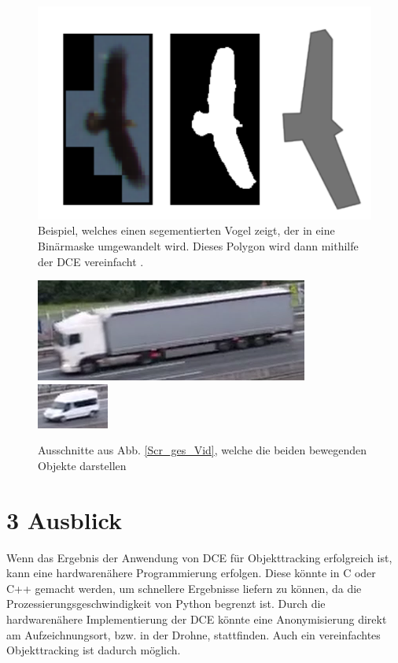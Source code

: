 \documentclass[a4paper,11pt,pdftex, parskip]{scrreprt}
\begin{document}
\begin{figure}[ht]
    \centering
    \includegraphics*[scale = 0.5, keepaspectratio]{images/Example_bird.png}
    \caption[Beispielablauf der Segmentierung und DCE aus \citet{Dorr2017}]{Beispiel, welches einen segementierten Vogel zeigt, der in eine Binärmaske umgewandelt wird. Dieses Polygon wird dann mithilfe der DCE vereinfacht \citep{Dorr2017}.}
    \label{Bsp_Dorr}
\end{figure}
\begin{figure}[ht]
    \centering
    \includegraphics[scale = 1, keepaspectratio] {images/detail_screenshot_lkw_yt.png}
    \includegraphics[scale = 2.25, keepaspectratio] {images/detail_screenshot_car_yt.png}
    \caption[Ausschnitte aus Abb. \ref{Scr_ges_Vid}, welche bewegenden Objekte darstellen ]{Ausschnitte aus Abb. \ref{Scr_ges_Vid}, welche die beiden bewegenden Objekte darstellen \citep{Metz2022}}
    \label{Scr_detail_Obj}
\end{figure}




\section*{3 Ausblick}
Wenn das Ergebnis der Anwendung von DCE für Objekttracking erfolgreich ist, kann eine hardwarenähere Programmierung erfolgen. Diese könnte in C oder C++ gemacht werden, um schnellere Ergebnisse liefern zu können, da die Prozessierungsgeschwindigkeit von Python begrenzt ist.\newline
Durch die hardwarenähere Implementierung der DCE könnte eine Anonymisierung direkt am Aufzeichnungsort, bzw. in der Drohne, stattfinden. Auch ein vereinfachtes Objekttracking ist dadurch möglich.
\end{document}
